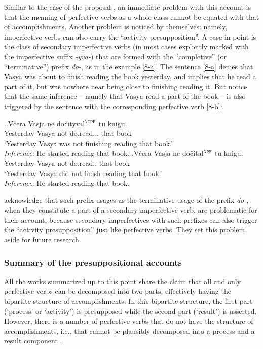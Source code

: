 Similar to the case of the proposal \citet{Romanova:06}, an immediate problem with this account is that the meaning of perfective verbs as a whole class cannot be equated with that of accomplishments. Another problem is noticed by \citet{Docekal:09} themselves: namely, imperfective verbs can also carry the ``activity presupposition''. A case in point is the class of secondary imperfective verbs (in most cases explicitly marked with the imperfective suffix \textit{-yva-}) that are formed with the ``completive'' (or ``terminative'') prefix \textit{do-}, as in the example \ref{8-a}. The sentence \ref{8-a} denies that Vasya was about to finish reading the book yesterday, and implies that he read a part of it, but was nowhere near being close to finishing reading it. But notice that the same inference -- namely that Vasya read a part of the book -- is also triggered by the sentence with the corresponding perfective verb \ref{8-b}:

\ex.\label{8}\ag.\label{8-a}V\v{c}era Vasja ne do\v{c}ityval$^{\IPF}$ tu knigu.\\
Yesterday Vasya not do.read... that book\\
\trans `Yesterday Vasya was not finishing reading that book.'\\
\textit{Inference}: He started reading that book.
\bg.\label{8-b}V\v{c}era Vasja ne do\v{c}ital$^{\PF}$ tu knigu.\\
Yesterday Vasya not do.read.. that book\\
\trans `Yesterday Vasya did not finish reading that book.'\\
\textit{Inference}: He started reading that book.

\citet{Docekal:09} acknowledge that such prefix usages as the terminative usage of the prefix \textit{do-}, when they constitute a part of a secondary imperfective verb, are problematic for their account, because secondary imperfectives with such prefixes can also trigger the ``activity presupposition'' just like perfective verbs. They set this problem aside for future research. 

\subsubsection{Summary of the presuppositional accounts}
All the works summarized up to this point share the claim that all and only perfective verbs can be decomposed into two parts, effectively having the bipartite structure of accomplishments. In this bipartite structure, the first part (`process' or `activity') is presupposed while the second part (`result') is asserted. However, there is a number of perfective verbs that do not have the structure of accomplishments, i.e., that cannot be plausibly decomposed into a process and a result component \citep[see][and references therein]{Filip:00, FilipRothstein:05}. 

